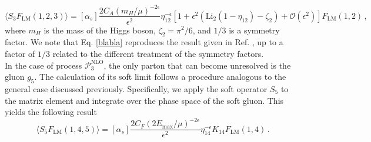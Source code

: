 \documentclass[a4paper, 12pt]{book}
\begin{document}
\begin{equation}
  \langle S_3 F_\mathrm{LM}(1,2,3) \rangle = [\alpha_s]  \frac{2 C_A (m_H/\mu)^{-2 \epsilon}}{\epsilon^2} \eta_{12}^{-\epsilon}[1+\epsilon^2(\mathrm{Li}_2(1-\eta_{12})-\zeta_2)+\mathcal{O}(\epsilon^2)]F_\mathrm{LM}(1,2) \, ,
  \label{blabla}
\end{equation}
where $m_H$ is the mass of the Higgs boson, $\zeta_2 = \pi^2/6$, and $1/3$ is a symmetry factor. We note that Eq. \ref{blabla} reproduces the result given in Ref. \cite{Caola:1907}, up to a factor of $1/3$ related to the different treatment of the symmetry factors. \\

In the case of process $\mathcal{P}_{3}^{\mathrm{NLO}}$, the only parton that can become unresolved is the gluon $g_5$. The calculation of its soft limit follows a procedure analogous to the general case discussed previously. Specifically, we apply the soft operator $S_5$ to the matrix element and integrate over the phase space of the soft gluon. This yields the following result
\begin{equation}
  \langle S_5 F_\mathrm{LM}(1,4,5) \rangle =  [\alpha_s]  \frac{2 C_F (2E_{\mathrm{max}}/\mu)^{-2\epsilon} }{\epsilon^2} \eta_{14}^{-\epsilon} K_{14} F_\mathrm{LM}(1,4) \, .
\end{equation}

\end{document}

